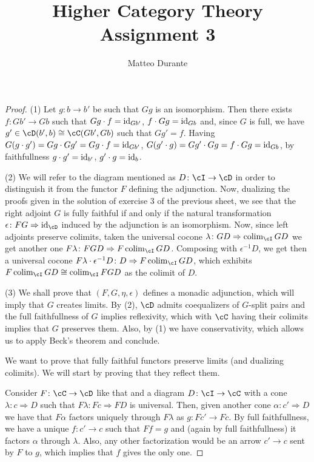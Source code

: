 \documentclass[a4paper,11pt,openany]{scrartcl}
\begin{document}
\title{Higher Category Theory\\ Assignment 3}

\author{Matteo Durante}

\maketitle

\begin{proof}
    (1) Let $g\colon b\rightarrow b'$ be such that $Gg$ is an isomorphism. Then
    there exists $f\colon Gb'\rightarrow Gb$ such that $Gg\cdot f=\operatorname{id}_{Gb'}$,
    $f\cdot Gg=\operatorname{id}_{Gb}$ and, since $G$ is full, we have
    $g'\in\cD(b',b)\cong\cC(Gb',Gb)$ such that $Gg'=f$. Having $G(g\cdot
    g')=Gg\cdot Gg'=Gg\cdot f=\operatorname{id}_{Gb'}$, $G(g'\cdot g)=Gg'\cdot Gg=f\cdot
    Gg=\operatorname{id}_{Gb}$, by faithfullness $g\cdot g'=\operatorname{id}_{b'}$, $g'\cdot g=\operatorname{id}_b$.

    (2) We will refer to the diagram mentioned as $D\colon\cI\rightarrow\cD$ in
    order to distinguish it from the functor $F$ defining the adjunction. Now,
    dualizing the proofs given in the solution of exercise 3 of the previous
    sheet, we see that the right adjoint $G$ is fully faithful if and only if
    the natural transformation $\epsilon\colon FG\Rightarrow\id_{\cD}$ induced
    by the adjunction is an isomorphism. Now, since left adjoints preserve
    colimits, taken the universal cocone $\lambda\colon GD\Rightarrow\colim_\cI
    GD$ we get another one $F\lambda\colon FGD\Rightarrow
    F\colim_{\cI}GD$. Composing with $\epsilon^{-1}D$, we get then a universal
    cocone $F\lambda\cdot\epsilon^{-1}D\colon D\Rightarrow
    F\colim_{\cI}GD$,
    which exhibits $F\colim_{\cI}GD\cong\colim_{\cI}FGD$ as the colimit of $D$.

    (3) We shall prove that $(F,G,\eta,\epsilon)$ defines a monadic adjunction,
    which will imply that $G$ creates limits. By (2), $\cD$ admits coequalizers
    of $G$-split pairs and the full faithfullness of $G$ implies reflexivity,
    which with $\cC$ having their colimits implies that $G$ preserves them.
    Also, by (1) we have conservativity, which allows us to apply Beck's theorem
    and conclude.

    We want to prove that fully faithful functors preserve limits (and dualizing
    colimits). We will start by proving that they reflect them.

    Consider $F\colon\cC\rightarrow\cD$ like that and a diagram
    $D\colon\cI\rightarrow\cC$ with a cone $\lambda\colon c\Rightarrow D$ such
    that $F\lambda\colon Fc\Rightarrow FD$ is universal. Then, given another
    cone $\alpha\colon c'\Rightarrow D$ we have that $F\alpha$ factors uniquely
    through $F\lambda$ as $g\colon Fc'\rightarrow Fc$. By full faithfullness, we
    have a unique $f\colon c'\rightarrow c$ such that $Ff=g$ and (again by full
    faithfullness) it factors $\alpha$ through $\lambda$. Also, any other
    factorization would be an arrow $c'\rightarrow c$ sent by $F$ to $g$, which
    implies that $f$ gives the only one.


\end{proof}
\end{document}
